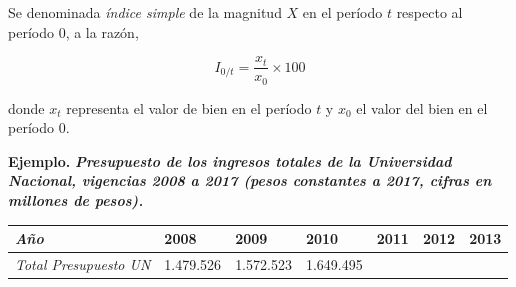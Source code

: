 \documentclass[
]{book}
\begin{document}
Se denominada \emph{índice simple} de la magnitud \(X\) en el período \(t\) respecto al período \(0\), a la razón,

\[\begin{equation}
I_{0/t}=\frac{x_t}{x_0}\times 100
\end{equation}\]

donde \(x_t\) representa el valor de bien en el período \(t\) y \(x_0\) el valor del bien en el período \(0\).

\textbf{Ejemplo.} \textbf{\emph{Presupuesto de los ingresos totales de la Universidad Nacional, vigencias 2008 a 2017 (pesos constantes a 2017, cifras en millones de pesos).}}

\begin{longtable}[]{@{}lllllll@{}}
\toprule
\begin{minipage}[b]{0.12\columnwidth}\raggedright
\emph{Año}\strut
\end{minipage} & \begin{minipage}[b]{0.10\columnwidth}\raggedright
2008\strut
\end{minipage} & \begin{minipage}[b]{0.11\columnwidth}\raggedright
2009\strut
\end{minipage} & \begin{minipage}[b]{0.13\columnwidth}\raggedright
2010\strut
\end{minipage} & \begin{minipage}[b]{0.12\columnwidth}\raggedright
2011\strut
\end{minipage} & \begin{minipage}[b]{0.12\columnwidth}\raggedright
2012\strut
\end{minipage} & \begin{minipage}[b]{0.12\columnwidth}\raggedright
2013\strut
\end{minipage}\tabularnewline
\midrule
\endhead
\begin{minipage}[t]{0.12\columnwidth}\raggedright
\emph{Total Presupuesto UN}\strut
\end{minipage} & \begin{minipage}[t]{0.10\columnwidth}\raggedright
1.479.526\strut
\end{minipage} & \begin{minipage}[t]{0.11\columnwidth}\raggedright
1.572.523\strut
\end{minipage} & \begin{minipage}[t]{0.13\columnwidth}\raggedright
1.649.495\strut
\end{minipage} & \begin{minipage}[t]{0.12\columnwidth}\raggedright

\end{minipage}
\end{longtable}
\end{document}
